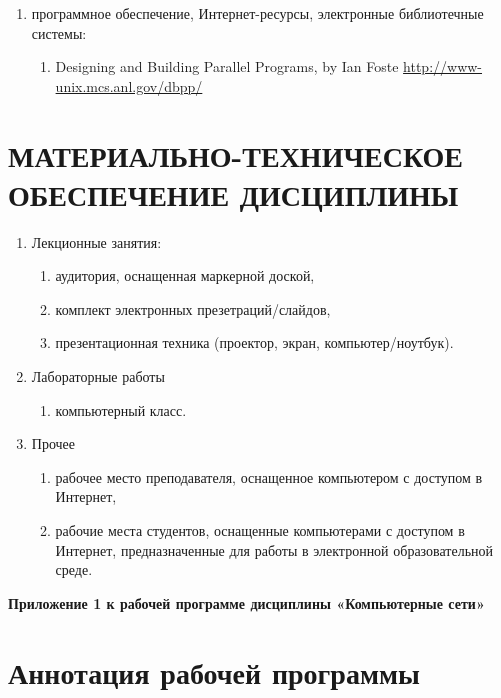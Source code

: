 \begin{center}
\begin{enumerate}
 \item программное обеспечение, Интернет-ресурсы, электронные библиотечные системы:
\begin{enumerate}[resume]
\item \label{www1} Designing and Building Parallel Programs, by Ian Foste \url{http://www-unix.mcs.anl.gov/dbpp/}
\end{enumerate}
\end{enumerate}

\newpage
\section{МАТЕРИАЛЬНО-ТЕХНИЧЕСКОЕ ОБЕСПЕЧЕНИЕ ДИСЦИПЛИНЫ}


\begin{enumerate}
\item Лекционные занятия:
\begin{enumerate}
\item аудитория, оснащенная маркерной доской, \item комплект электронных презетраций/слайдов, \item презентационная техника (проектор, экран, компьютер/ноутбук).
\end{enumerate}
\item Лабораторные работы
\begin{enumerate}
\item компьютерный класс.
\end{enumerate}
\item Прочее
\begin{enumerate}
\item рабочее место преподавателя, оснащенное компьютером с доступом в Интернет, \item рабочие места студентов, оснащенные компьютерами с доступом в Интернет, предназначенные для работы в электронной образовательной среде.
\end{enumerate}
\end{enumerate}

\newpage
\begin{flushright}
\textbf{Приложение 1
к рабочей программе дисциплины
«Компьютерные сети»}
\end{flushright}
\section*{Аннотация рабочей программы}


\end{center}
